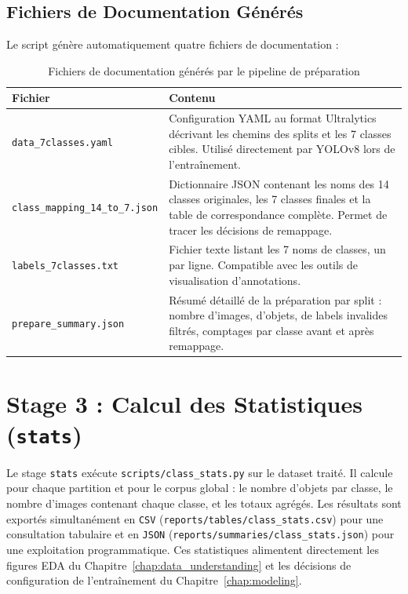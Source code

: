 \documentclass{rapportENSIAS}
\newcommand{\projectpath}[1]{\texttt{#1}}
\begin{document}
\subsection{Fichiers de Documentation Générés}

Le script génère automatiquement quatre fichiers de documentation :

\begin{table}[H]
\centering
\caption{Fichiers de documentation générés par le pipeline de préparation}
\label{tab:fichiers_doc}
\begin{tabular}{p{5.5cm} p{8.5cm}}
\toprule
\textbf{Fichier} & \textbf{Contenu} \\
\midrule
\texttt{data\_7classes.yaml}
  & Configuration YAML au format Ultralytics décrivant les chemins des splits
    et les 7 classes cibles. Utilisé directement par YOLOv8 lors de l'entraînement. \\
\midrule
\texttt{class\_mapping\_14\_to\_7.json}
  & Dictionnaire JSON contenant les noms des 14 classes originales, les 7 classes
    finales et la table de correspondance complète. Permet de tracer les décisions
    de remappage. \\
\midrule
\texttt{labels\_7classes.txt}
  & Fichier texte listant les 7 noms de classes, un par ligne. Compatible avec les
    outils de visualisation d'annotations. \\
\midrule
\texttt{prepare\_summary.json}
  & Résumé détaillé de la préparation par split : nombre d'images, d'objets,
    de labels invalides filtrés, comptages par classe avant et après remappage. \\
\bottomrule
\end{tabular}
\end{table}

\section{Stage 3 : Calcul des Statistiques (\texttt{stats})}

Le stage \texttt{stats} exécute \projectpath{scripts/class\_stats.py} sur le
dataset traité. Il calcule pour chaque partition et pour le corpus global :
le nombre d'objets par classe, le nombre d'images contenant chaque classe,
et les totaux agrégés. Les résultats sont exportés simultanément en
\texttt{CSV} (\projectpath{reports/tables/class\_stats.csv}) pour une
consultation tabulaire et en \texttt{JSON}
(\projectpath{reports/summaries/class\_stats.json}) pour une exploitation
programmatique. Ces statistiques alimentent directement les figures EDA
du Chapitre~\ref{chap:data_understanding} et les décisions de configuration
de l'entraînement du Chapitre~\ref{chap:modeling}.
\end{document}
